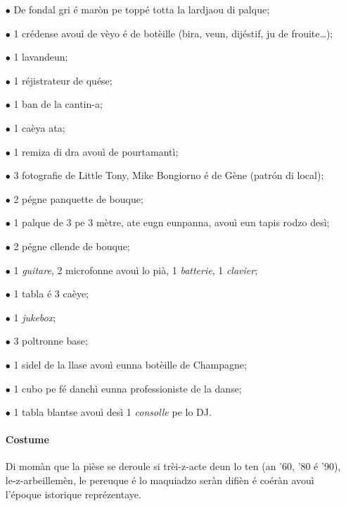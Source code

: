 \Scenographie
\begin{itemize}
\item[$\bullet$] De fondal gri é maròn pe toppé totta la lardjaou di palque;
\item[$\bullet$] 1 crédense avouì de vèyo é de botèille (bira, veun, dijéstif, ju de frouite\ldots);
\item[$\bullet$] 1 lavandeun;
\item[$\bullet$] 1 réjistrateur de quése;
\item[$\bullet$] 1 ban de la cantin-a;
\item[$\bullet$] 1 caèya ata;
\item[$\bullet$] 1 remiza di dra avouì de pourtamantì;
\item[$\bullet$] 3 fotografie de Little Tony, Mike Bongiorno é de Gène (patr\'on di local);
\item[$\bullet$] 2 pégne panquette de bouque;
\item[$\bullet$] 1 palque de 3 pe 3 mètre, ate eugn eunpanna, avouì eun tapis rodzo desì;
\item[$\bullet$] 2 pégne cllende de bouque;
\item[$\bullet$] 1 \textit{guitare}, 2 microfonne avouì lo pià, 1 \textit{batterie}, 1 \textit{clavier};
\item[$\bullet$] 1 tabla é 3 caèye;
\item[$\bullet$] 1 \textit{jukebox};
\item[$\bullet$] 3 poltronne base;
\item[$\bullet$] 1 sidel de la llase avouì eunna botèille de Champagne;
\item[$\bullet$] 1 cubo pe fé danchì eunna professioniste de la danse;
\item[$\bullet$] 1 tabla blantse avouì desì 1 \textit{consolle} pe lo DJ. 

\paragraph*{Costume} Di momàn que la pièse se deroule si trèi-z-acte deun lo ten (an '60, '80 é '90), le-z-arbeillemèn, le pereuque é lo maquiadzo seràn difièn é coéràn avouì l'époque istorique reprézentaye.


\end{itemize}

\setlength{\lengthchar}{3.125cm}


